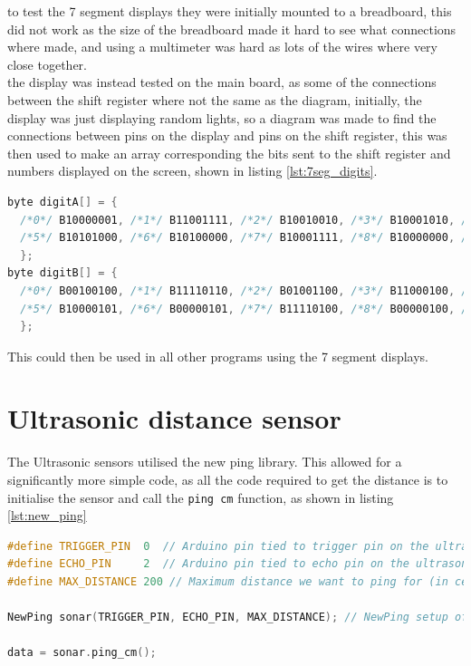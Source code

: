 to test the 7 segment displays they were initially mounted to a breadboard, this did not work as the size of the breadboard made it hard to see what connections where made, and using a multimeter was hard as lots of the wires where very close together.\\
the display was instead tested on the main board, as some of the connections between the shift register where not the same as the diagram, initially, the display was just displaying random lights, so a diagram was made to find the connections between pins on the display and pins on the shift register, this was then used to make an array corresponding the bits sent to the shift register and numbers displayed on the screen, shown in listing \ref{lst:7seg_digits}.

  \begin{lstlisting}[language=c,caption={7 segment digit array},label={lst:7seg_digits}]
byte digitA[] = {
  /*0*/ B10000001, /*1*/ B11001111, /*2*/ B10010010, /*3*/ B10001010, /*4*/ B11001100,
  /*5*/ B10101000, /*6*/ B10100000, /*7*/ B10001111, /*8*/ B10000000, /*9*/ B10001000,
  };
byte digitB[] = {
  /*0*/ B00100100, /*1*/ B11110110, /*2*/ B01001100, /*3*/ B11000100, /*4*/ B10010110,
  /*5*/ B10000101, /*6*/ B00000101, /*7*/ B11110100, /*8*/ B00000100, /*9*/ B10000100
  };
\end{lstlisting}

This could then be used in all other programs using the 7 segment displays.

\section{Ultrasonic distance sensor}

The Ultrasonic sensors utilised the new ping library. This allowed for a significantly more simple code, as all the code required to get the distance is to initialise the sensor and call the \texttt{ping cm} function, as shown in listing \ref{lst:new_ping}

  \begin{lstlisting}[language=c,caption={New ping usage},label={lst:new_ping}]
#define TRIGGER_PIN  0  // Arduino pin tied to trigger pin on the ultrasonic sensor.
#define ECHO_PIN     2  // Arduino pin tied to echo pin on the ultrasonic sensor.
#define MAX_DISTANCE 200 // Maximum distance we want to ping for (in centimeters). Maximum sensor distance is rated at 400-500cm.

NewPing sonar(TRIGGER_PIN, ECHO_PIN, MAX_DISTANCE); // NewPing setup of pins and maximum distance.

data = sonar.ping_cm();
\end{lstlisting}

